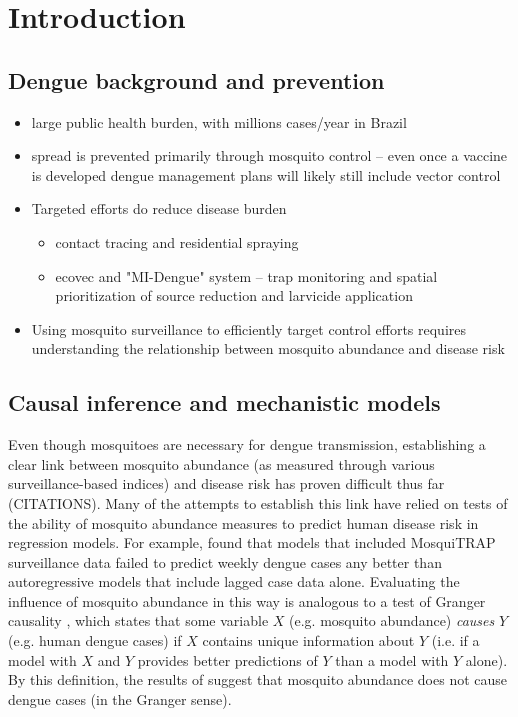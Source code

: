 \documentclass[10pt,letterpaper]{article}
\begin{document}
\linenumbers

\section*{Introduction}


\subsection*{Dengue background and prevention}
\begin{itemize}
  \item large public health burden, with millions cases/year in Brazil
  \item spread is prevented primarily through mosquito control -- even once a vaccine is developed dengue management plans will likely still include vector control \cite{Achee2015}
  \item Targeted efforts do reduce disease burden 
  \begin{itemize}
    \item contact tracing and residential spraying \cite{Vazquez-Prokopec2017}
  	\item ecovec and "MI-Dengue" system -- trap monitoring and spatial prioritization of source reduction and larvicide application \cite{Eiras2009, Pepin2013}
  \end{itemize}
  \item Using mosquito surveillance to efficiently target control efforts requires understanding the relationship between mosquito abundance and disease risk
\end{itemize}

\subsection*{Causal inference and mechanistic models}

Even though mosquitoes are necessary for dengue transmission, establishing a clear link between mosquito abundance (as measured through various surveillance-based indices) and disease risk has proven difficult thus far (CITATIONS).
Many of the attempts to establish this link have relied on tests of the ability of mosquito abundance measures to predict human disease risk in regression models.
For example, \cite{Pepin2015} found that models that included MosquiTRAP surveillance data failed to predict weekly dengue cases any better than autoregressive models that include lagged case data alone.
Evaluating the influence of mosquito abundance in this way is analogous to a test of Granger causality \cite{Granger1969}, which states that some variable $X$ (e.g. mosquito abundance) \emph{causes} $Y$ (e.g. human dengue cases) if $X$ contains unique information about $Y$ (i.e. if a model with $X$ and $Y$ provides better predictions of $Y$ than a model with $Y$ alone).
By this definition, the results of \cite{Pepin2015} suggest that mosquito abundance does not cause dengue cases (in the Granger sense).
\end{document}
